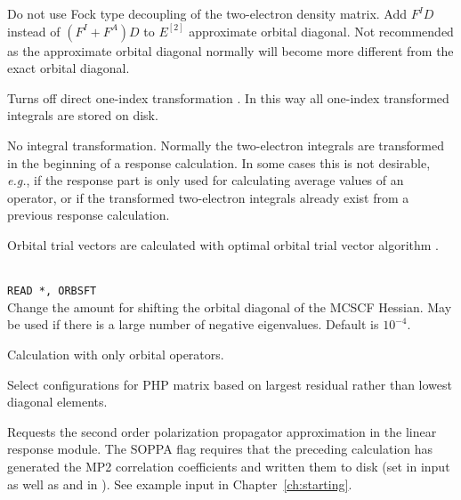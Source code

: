 \begin{description}
\item{}
Do not use Fock type decoupling of the two-electron density matrix.
Add $F^ID$ instead of $(F^I+F^A)D$ to $E^{[2]}$ approximate
orbital diagonal. Not recommended as the approximate orbital diagonal
normally will become more different from the exact orbital diagonal.

\item{}
Turns off direct one-index transformation \cite{ovhahjajjcc15}. 
In this way all one-index transformed integrals are stored on disk.

\item{}
No integral transformation. Normally the two-electron integrals are 
transformed in the beginning of a response calculation. In some cases
this is not desirable, {\it e.g.\/}, if the response part is only used for
calculating average values of an operator, or if the transformed two-electron
integrals already exist from a previous response calculation. 

\item{}
Orbital trial vectors are calculated with optimal orbital
trial vector
algorithm \cite{tuhjahjajpjjcp84}.

\item{}\\
\verb|READ *, ORBSFT|\\
Change the amount for shifting the orbital
diagonal of the MCSCF Hessian.
May be used if there is a large number of negative eigenvalues.
Default is $10^{-4}$. 

\item{}
Calculation with only orbital operators. 

\item{}
Select configurations for PHP matrix based on largest residual
rather than lowest diagonal elements.


\item{}
Requests the second order polarization propagator approximation 
in the linear response module.
The SOPPA
flag requires that
the preceding {\sir} calculation has generated the MP2 correlation
coefficients and written them to disk (set  in 
input as well as  and  in ). See
example input in Chapter~\ref{ch:starting}.


\end{description}
